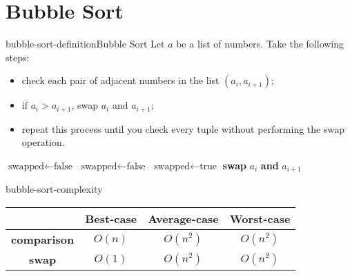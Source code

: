 \documentclass[preview]{standalone}
\begin{document}
\genpage

\section{Bubble Sort}

\begin{snippetdefinition}{bubble-sort-definition}{Bubble Sort}
    Let \(a\) be a list of numbers. Take the following steps:
    \begin{itemize}
        \item check each pair of adjacent numbers in the list \((a_i,a_{i+1})\);
        \item if \(a_i>a_{i+1}\), swap \(a_i\) and \(a_{i+1}\);
        \item repeat this process until you check every tuple without performing the swap operation.
    \end{itemize}
    \hr
    \begin{algorithmic}[1]
        \State \(\text{swapped}\gets\text{false}\)
        \Do{}
            \State \(\text{swapped}\gets\text{false}\)
                    \State \(\text{swapped}\gets\text{true}\)
                    \State \textbf{swap} \(a_i\) \textbf{and} \(a_{i+1}\)
                \EndIf
            \EndFor
    \end{algorithmic}
    \hr
\end{snippetdefinition}

\begin{snippet}{bubble-sort-complexity}
    \def\arraystretch{1.5}
    \begin{center}
        \begin{tabular}{ |c|c|c|c| }
            \hline
            & \textbf{Best-case} & \textbf{Average-case} &\textbf{Worst-case} \\
            \hline
            \textbf{comparison} & \(O(n)\) & \(O(n^2)\) & \(O(n^2)\) \\ 
            \hline
            \textbf{swap} & \(O(1)\) & \(O(n^2)\) & \(O(n^2)\) \\ 
            \hline
        \end{tabular}
    \end{center}
    \vspace{0.5cm}
\end{snippet}
\end{document}
